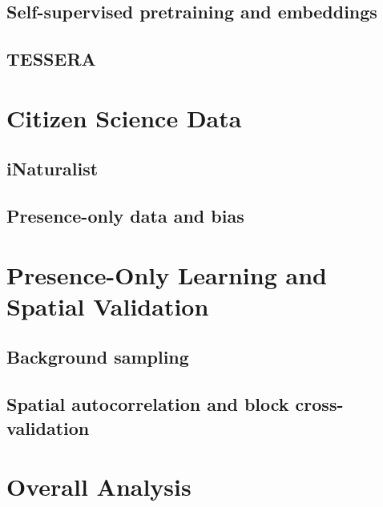 \subsection{Self-supervised pretraining and embeddings}
\label{sec:background-fm-embeddings}

\subsection{TESSERA}
\label{sec:background-fm-tessera}

\section{Citizen Science Data}
\label{sec:background-cs}

\subsection{iNaturalist}
\label{sec:background-cs-inaturalist}

\subsection{Presence-only data and bias}
\label{sec:background-cs-presence-only}

\section{Presence-Only Learning and Spatial Validation}
\label{sec:background-po}

\subsection{Background sampling}
\label{sec:background-po-background}

\subsection{Spatial autocorrelation and block cross-validation}
\label{sec:background-po-spatial}

\section{Overall Analysis}
\label{sec:background-overall}
